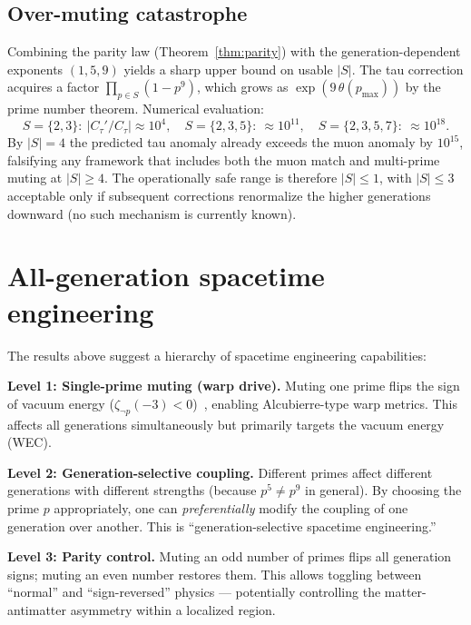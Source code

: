 \documentclass[11pt,a4paper]{article}
\begin{document}
\subsection{Over-muting catastrophe}
\label{sec:over_muting}

Combining the parity law (Theorem~\ref{thm:parity}) with the
generation-dependent exponents $(1, 5, 9)$ yields a sharp upper
bound on usable $|S|$. The tau correction acquires a factor
$\prod_{p\in S}(1-p^9)$, which grows as
$\exp(9\,\theta(p_{\max}))$ by the prime number theorem. Numerical
evaluation:
\[
S=\{2,3\}\!:~ |C_\tau'/C_\tau| \approx 10^{4},\quad
S=\{2,3,5\}\!:~ \approx 10^{11},\quad
S=\{2,3,5,7\}\!:~ \approx 10^{18}.
\]
By $|S|=4$ the predicted tau anomaly already exceeds the muon
anomaly by $10^{15}$, falsifying any framework that includes both
the muon match and multi-prime muting at $|S|\geq 4$. The
operationally safe range is therefore $|S|\leq 1$, with $|S|\leq 3$
acceptable only if subsequent corrections renormalize the higher
generations downward (no such mechanism is currently known).

\section{All-generation spacetime engineering}
\label{sec:engineering}

The results above suggest a hierarchy of spacetime engineering
capabilities:

\textbf{Level 1: Single-prime muting (warp drive).}
Muting one prime flips the sign of vacuum energy
($\zeta_{\neg p}(-3) < 0$)~\cite{paper_A}, enabling
Alcubierre-type warp metrics. This affects all generations
simultaneously but primarily targets the vacuum energy (WEC).

\textbf{Level 2: Generation-selective coupling.}
Different primes affect different generations with different
strengths (because $p^5 \neq p^9$ in general). By choosing
the prime $p$ appropriately, one can \emph{preferentially}
modify the coupling of one generation over another.
This is ``generation-selective spacetime engineering.''

\textbf{Level 3: Parity control.}
Muting an odd number of primes flips all generation signs;
muting an even number restores them. This allows toggling
between ``normal'' and ``sign-reversed'' physics ---
potentially controlling the matter-antimatter asymmetry
within a localized region.
\end{document}
